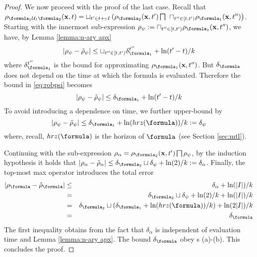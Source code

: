 \begin{proof}
We now proceed with the proof of the last case.
Recall that $\rob_{ \formula_1 \until_I \formula_2} (\sstraj,t) = \sqcup_{t' \in t+_{\TDom}I} \left(\rob_{\formula_2} (\sstraj,t') \bigsqcap \right.
\\
\left. \sqcap_{t'' \in [t,t')}   \rob_{\formula_1} (\sstraj,t'') \right)$.
Starting with the innermost sub-expression $\rob_\psi \defeq \sqcap_{t'' \in [t,t')}   \rob_{\formula_1} (\sstraj,t'')$, we have, by Lemma \ref{lemma:n-ary apx}
\begin{equation}
\label{eq:robpsi}
|\rob_{\psi}-\srob_\psi| \leq \sqcup_{t'' \in [t,t')}\delta_{\formula_1}^{t''} + \ln(t'-t)/k
\end{equation} 
where $\delta_{\formula_1}^{t''} $ is the bound for approximating $\rob_{\formula_1}(\sstraj,t'')$.
But $\delta_\formula$ does not depend on the time at which the formula is evaluated. 
Therefore the bound in \eqref{eq:robpsi} becomes
\begin{equation}
\label{eq:t'-t}
|\rob_{\psi}-\srob_\psi| \leq \delta_{\formula_1} + \ln(t'-t)/k
\end{equation} 
%
To avoid introducing a dependence on time, we further upper-bound by 
\begin{equation*}
|\rob_{\psi}-\srob_\psi| \leq \delta_{\formula_1} + \ln(hrz(\formula))/k \defeq \delta_\psi
\end{equation*} 
where, recall, $hrz(\formula)$ is the horizon of $\formula$ (see Section \ref{sec:mtl}).

Continuing with the sub-expression $\rob_\alpha = \rob_{\formula_2} (\sstraj,t') \bigsqcap \rob_\psi$, by the induction hypothesis it holds that 
$|\rob_\alpha - \srob_\alpha| \leq \delta_{\formula_2} \sqcup \delta_\psi + \ln(2)/k \defeq \delta_\alpha$.
%
Finally, the top-most max operator introduces the total error 
\begin{eqnarray}
\label{eq:deltaphi until}
|\robf-\srobf| &\leq& \delta_\alpha + \ln(|I|)/k 
\nonumber
\\
&=& \delta_{\formula_2} \sqcup \delta_\psi + \ln(2)/k + \ln(|I|)/k 
\nonumber 
\\
&=& \delta_{\formula_2} \sqcup ( \delta_{\formula_1} + \ln(hrz(\formula))/k )+ \ln(2|I|)/k 
\nonumber
\\
&=&\delta_\formula
\end{eqnarray}
The first inequality obtains from the fact that $\delta_\alpha$ is independent of evaluation time and Lemma \ref{lemma:n-ary apx}.
The bound $\delta_\formula$ obey s (a)-(b).
This concludes the proof.
	\end{proof}
	
